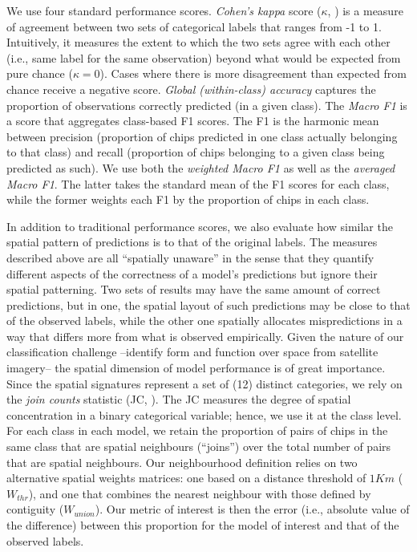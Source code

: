 We use four standard performance scores. \textit{Cohen's kappa} score ($\kappa$,
\citealp{cohen1960coefficient}) is a measure of agreement between two sets of
categorical labels that ranges from -1 to 1. Intuitively, it measures the
extent to which the two sets agree with each other (i.e., same label for the
same observation) beyond what would be expected from pure chance
($\kappa=0$). Cases where there is more disagreement than expected from chance
receive a negative score. \textit{Global (within-class) accuracy} captures the
proportion of observations correctly predicted (in a given class). The
\textit{Macro F1} is a score that aggregates class-based F1
scores. The F1 is the harmonic mean between precision (proportion of
chips predicted in one class actually belonging to that class) and recall
(proportion of chips belonging to a given class being predicted as such).
We use both the \textit{weighted Macro F1} as well as the \textit{averaged
Macro F1}. The latter takes the standard mean of the F1 scores for each class,
while the former weights each F1 by the proportion of chips in each class.

In addition to traditional performance scores, we also evaluate how similar
the spatial pattern of predictions is to that of the original labels.
The measures described above are all ``spatially unaware'' in the sense that
they quantify different aspects of the correctness of a model's
predictions but ignore their spatial patterning. Two
sets of results may have the same amount of correct predictions, but in one,
the spatial layout of such predictions may be close to
that of the observed labels, while the other one spatially allocates mispredictions in
a way that differs more from what is observed empirically. Given the nature of
our classification challenge --identify form and
function over space from satellite imagery-- the spatial dimension of model
performance is of great importance. Since the spatial signatures represent a
set of (12) distinct categories, we rely on the \textit{join counts} statistic
(JC, \citealp{cliff1981spatial}). The JC measures the degree of spatial
concentration in a binary categorical variable; hence, we use it at the class
level. For each class in each model, we retain the proportion of pairs of
chips in the same class that are spatial neighbours (``joins'') over the total number of
pairs that are spatial neighbours.
Our neighbourhood definition relies on two alternative spatial weights matrices:
one based on a distance threshold of $1Km$ ($W_{thr}$), and one that combines
the nearest neighbour with those defined by contiguity ($W_{union}$).
Our metric of interest is then the error (i.e., absolute
value of the difference) between this proportion for the model of interest and
that of the observed labels.

